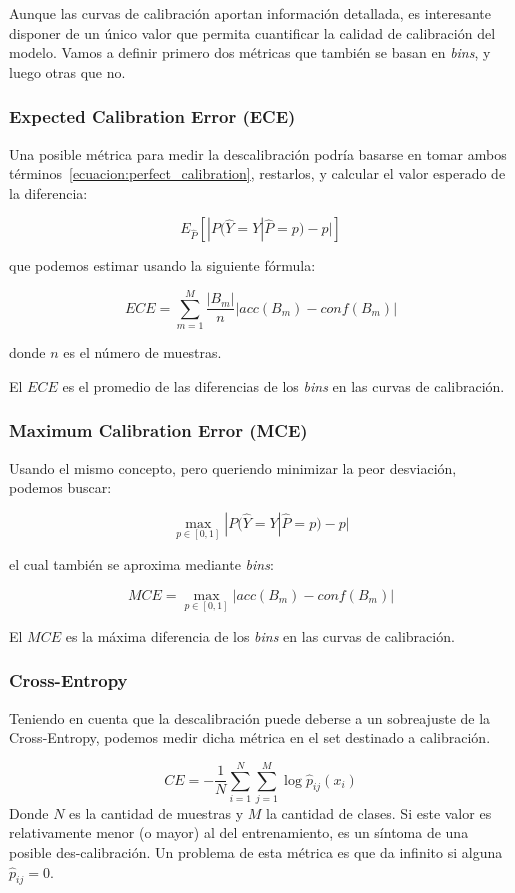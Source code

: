 Aunque las curvas de calibración aportan información detallada, es interesante
disponer de un único valor que permita cuantificar la calidad de calibración del
modelo. Vamos a definir primero dos métricas que también se basan en {\it
bins\/}, y luego otras que no.

\subsubsection{Expected Calibration Error (ECE)}\label{calibracion:ECE}

Una posible métrica para medir la descalibración podría basarse en tomar ambos
términos~\ref{ecuacion:perfect_calibration}, restarlos, y calcular el valor
esperado de la diferencia:

$$E_{\hat{P}}[|P(\hat{Y}= Y | \hat{P}=p) - p|]$$

que podemos estimar usando la siguiente fórmula:

$$ECE = \sum_{m=1}^{M} \frac{|B_m|}{n}|acc(B_m) - conf(B_m)|$$

donde $n$ es el número de muestras.

El $ECE$ es el promedio de las diferencias de los {\it bins\/} en las curvas de
calibración.

\subsubsection{Maximum Calibration Error (MCE)}\label{calibracion:MCE}

Usando el mismo concepto, pero queriendo minimizar la peor desviación, podemos
buscar:

$$\displaystyle \max_{p\in [0,1]}|P(\hat{Y}= Y | \hat{P}=p) - p|$$

el cual también se aproxima mediante {\it bins\/}:

$$\displaystyle MCE = \max_{p\in [0,1]}|acc(B_m) - conf(B_m)|$$

El $MCE$ es la máxima diferencia de los {\it bins\/} en las curvas de
calibración.

\subsubsection{Cross-Entropy}\label{calibracion:Cross-Entropy}

Teniendo en cuenta que la descalibración puede deberse a un sobreajuste de la
Cross-Entropy, podemos medir dicha métrica en el set destinado a calibración.

$$ CE = - \frac{1}{N}\sum _{i=1}^{N} \sum _{j=1}^{M} \log \hat p_{ij}(x_i) $$
Donde $N$ es la cantidad de muestras y $M$ la cantidad de clases. Si este valor
es relativamente menor (o mayor) al del entrenamiento, es un síntoma de una
posible des-calibración. Un problema de esta métrica es que da infinito si
alguna $\hat p_{ij} = 0$.

